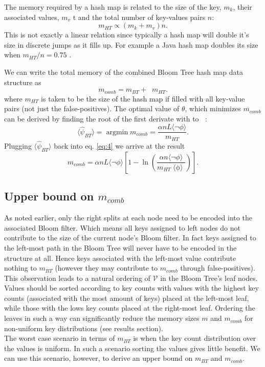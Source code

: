 \documentclass[12pt]{article}
\DeclareMathOperator*{\epsi}{ \langle \psi_{BT} \rangle}
\DeclareMathOperator*{\ephi}{ \langle \phi \rangle}
\begin{document}
The memory required by a hash map is related to the size of the key, $m_k$, their associated values, $m_v$ t and the total number of key-values pairs $n$: \begin{equation}
m_{HT} \propto (m_k + m_v)n.
\end{equation}
This is not exactly a linear relation since typically a hash map will double it's size in discrete jumps as it fills up. For example a Java hash map doubles its size when $m_{HT}/n = 0.75$ . 

We can write the total memory of the combined Bloom Tree hash map data structure as
\begin{equation} \label{eq:4}
m_{comb} =  m_{BT}+ \epsi m_{HT}.
\end{equation}
where $m_{HT}$ is taken to be the size of the hash map if filled with all key-value pairs (not just the false-positives). 
The optimal value of $\theta$, which minimizes $m_{comb}$ can be derived by finding the root of the first derivate with to $\epsi$:
\begin{equation}
\langle \hat{\psi}_{BT} \rangle =\operatorname*{argmin}_{\epsi} m_{comb} = \frac{\alpha n L \langle \lnot \phi \rangle}{m_{HT}}.
\end{equation}
Plugging $\langle \hat{\psi}_{BT} \rangle$ back into eq. \ref{eq:4} we arrive at the result
\begin{equation} \label{eq:5}
m_{comb} = \alpha  n L \langle \lnot \phi \rangle \left[ 1 - \ln \left(\frac{\alpha  n \langle \lnot \phi \rangle}{m_{HT} \ephi }\right) \right].
\end{equation}

\subsection*{Upper bound on $m_{comb}$}
As noted earlier, only the right splits at each node need to be encoded into the associated Bloom filter. Which means all keys assigned to left nodes do not contribute to the size of the current node's Bloom filter. In fact keys assigned to the left-most path in the Bloom Tree will never have to be encoded in the structure at all. Hence keys associated with the left-most value contribute nothing to $m_{BT}$ (however they may contribute to $m_{comb}$ through false-positives). \\
This observation leads to a natural ordering of $\mathcal{V}$ in the Bloom Tree's leaf nodes. Values should be sorted according to key counts with values with the highest key counts (associated with the most amount of keys) placed at the left-most leaf, while those with the lows key counts placed at the right-most leaf. Ordering the leaves in such a way can significantly reduce the memory sizes $m$ and $m_{comb}$ for non-uniform key distributions (see results section).\\
The worst case scenario in terms of $m_{BT}$ is when the key count distribution over the values is uniform. In such a scenario sorting the values gives little benefit. We can use this scenario, however, to derive an upper bound on $m_{BT}$ and $m_{comb}$. \\
\end{document}
